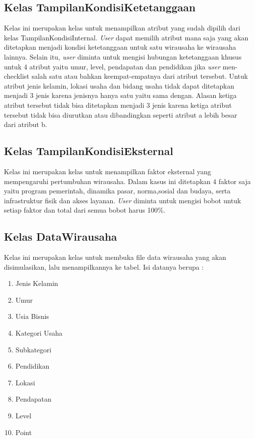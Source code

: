 \subsection{Kelas TampilanKondisiKetetanggaan}
Kelas ini merupakan kelas untuk menampilkan atribut yang sudah dipilih dari kelas TampilanKondisiInternal. \textit{User} dapat memilih atribut mana saja yang akan ditetapkan menjadi kondisi ketetanggaan untuk satu wirausaha ke wirausaha lainnya. Selain itu, \textit{user} diminta untuk mengisi hubungan ketetanggaan khusus untuk 4 atribut yaitu umur, level, pendapatan dan pendidikan jika \textit{user} men-checklist salah satu atau bahkan keempat-empatnya dari atribut tersebut. Untuk atribut jenis kelamin, lokasi usaha dan bidang usaha tidak dapat ditetapkan menjadi 3 jenis karena jenisnya hanya satu yaitu sama dengan. Alasan ketiga atribut tersebut tidak bisa ditetapkan menjadi 3 jenis karena ketiga atribut tersebut tidak bisa diurutkan atau dibandingkan seperti atribut a lebih besar dari atribut b.

\subsection{Kelas TampilanKondisiEksternal}
Kelas ini merupakan kelas untuk menampilkan faktor eksternal yang mempengaruhi pertumbuhan wirausaha. Dalam kasus ini ditetapkan 4 faktor saja yaitu program pemerintah, dinamika pasar, norma,sosial dan budaya, serta infrastruktur fisik dan akses layanan. \textit{User} diminta untuk mengisi bobot untuk setiap faktor dan total dari semua bobot harus 100\%.

\subsection{Kelas DataWirausaha}
Kelas ini merupakan kelas untuk membuka file data wirausaha yang akan disimulasikan, lalu menampilkannya ke tabel. Isi datanya berupa :
\begin{enumerate}
	\item Jenis Kelamin
	\item Umur
	\item Usia Bisnis
	\item Kategori Usaha
	\item Subkategori
	\item Pendidikan
	\item Lokasi
	\item Pendapatan
	\item Level
	\item Point
\end{enumerate}

